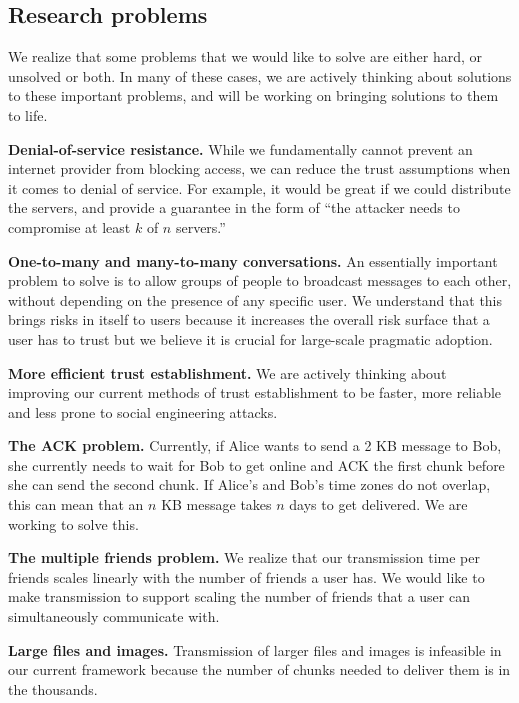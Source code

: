 \subsection{Research problems} 
We realize that some problems that we would like to solve are either hard, or unsolved or both. In many of these cases, we are actively thinking about solutions to these important problems, and will be working on bringing solutions to them to life.

\textbf{Denial-of-service resistance.} While we fundamentally cannot prevent an internet provider from blocking access, we can reduce the trust assumptions when it comes to denial of service. For example, it would be great if we could distribute the servers, and provide a guarantee in the form of ``the attacker needs to compromise at least $k$ of $n$ servers.''

\textbf{One-to-many and many-to-many conversations.} An essentially important problem to solve is to allow groups of people to broadcast messages to each other, without depending on the presence of any specific user. We understand that this brings risks in itself to users because it increases the overall risk surface that a user has to trust but we believe it is crucial for large-scale pragmatic adoption.

\textbf{More efficient trust establishment.} We are actively thinking about improving our current methods of trust establishment to be faster, more reliable and less prone to social engineering attacks.

\textbf{The ACK problem.} Currently, if Alice wants to send a 2 KB message to Bob, she currently needs to wait for Bob to get online and ACK the first chunk before she can send the second chunk. If Alice's and Bob's time zones do not overlap, this can mean that an $n$ KB message takes $n$ days to get delivered. We are working to solve this.

\textbf{The multiple friends problem.} We realize that our transmission time per friends scales linearly with the number of friends a user has. We would like to make transmission to support scaling the number of friends that a user can simultaneously communicate with.

\textbf{Large files and images.} Transmission of larger files and images is infeasible in our current framework because the number of chunks needed to deliver them is in the thousands.
